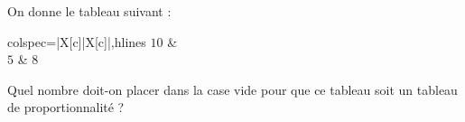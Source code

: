 
On donne le tableau suivant :

\smallskip

\begin{tblr}{colspec={|X[c]|X[c]|},hlines}
$10$ & \\
$5$ & $8$ \\
\end{tblr}

\smallskip

Quel nombre doit-on placer dans la case vide pour que ce tableau soit un tableau de proportionnalité ?

\smallskip

